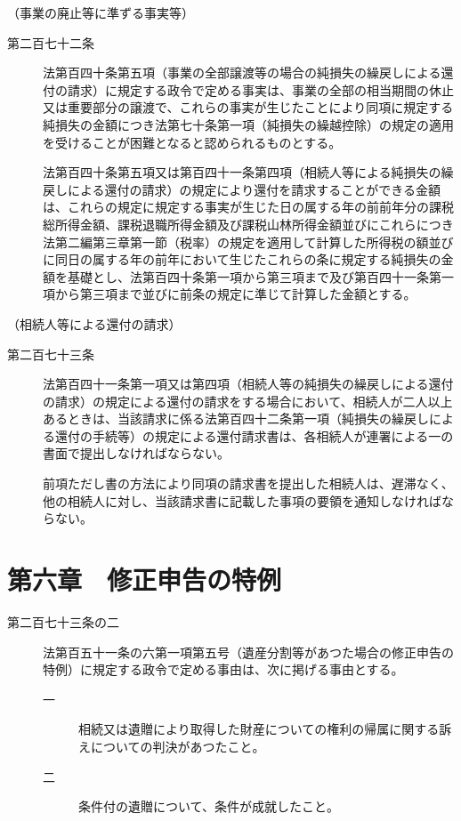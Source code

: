\documentclass[twocolumn,a4j,10pt]{ltjtarticle}
\begin{document}
\noindent\hspace{10pt}（事業の廃止等に準ずる事実等）
\begin{description}
\item[第二百七十二条]法第百四十条第五項（事業の全部譲渡等の場合の純損失の繰戻しによる還付の請求）に規定する政令で定める事実は、事業の全部の相当期間の休止又は重要部分の譲渡で、これらの事実が生じたことにより同項に規定する純損失の金額につき法第七十条第一項（純損失の繰越控除）の規定の適用を受けることが困難となると認められるものとする。
\item[]法第百四十条第五項又は第百四十一条第四項（相続人等による純損失の繰戻しによる還付の請求）の規定により還付を請求することができる金額は、これらの規定に規定する事実が生じた日の属する年の前前年分の課税総所得金額、課税退職所得金額及び課税山林所得金額並びにこれらにつき法第二編第三章第一節（税率）の規定を適用して計算した所得税の額並びに同日の属する年の前年において生じたこれらの条に規定する純損失の金額を基礎とし、法第百四十条第一項から第三項まで及び第百四十一条第一項から第三項まで並びに前条の規定に準じて計算した金額とする。
\end{description}
\noindent\hspace{10pt}（相続人等による還付の請求）
\begin{description}
\item[第二百七十三条]法第百四十一条第一項又は第四項（相続人等の純損失の繰戻しによる還付の請求）の規定による還付の請求をする場合において、相続人が二人以上あるときは、当該請求に係る法第百四十二条第一項（純損失の繰戻しによる還付の手続等）の規定による還付請求書は、各相続人が連署による一の書面で提出しなければならない。
\item[]前項ただし書の方法により同項の請求書を提出した相続人は、遅滞なく、他の相続人に対し、当該請求書に記載した事項の要領を通知しなければならない。
\end{description}
\section*{第六章　修正申告の特例}
\begin{description}
\item[第二百七十三条の二]法第百五十一条の六第一項第五号（遺産分割等があつた場合の修正申告の特例）に規定する政令で定める事由は、次に掲げる事由とする。
\begin{description}
\item[一]相続又は遺贈により取得した財産についての権利の帰属に関する訴えについての判決があつたこと。
\item[二]条件付の遺贈について、条件が成就したこと。
\end{description}
\end{description}
\end{document}
